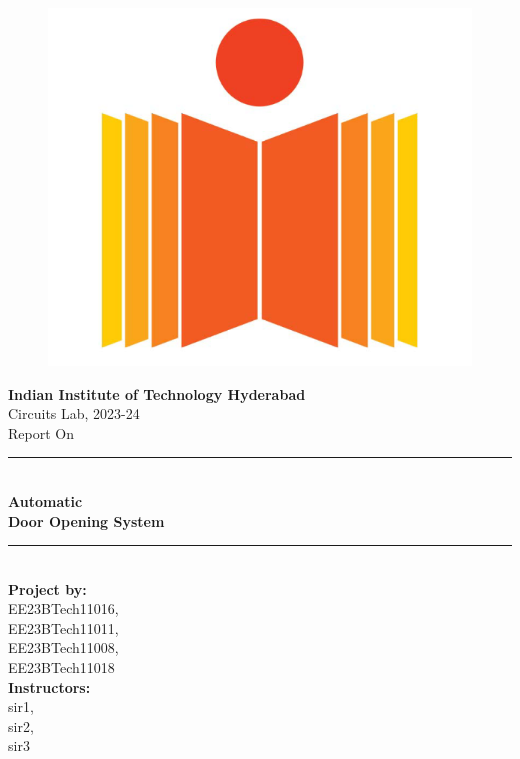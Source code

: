 \documentclass{article}
\begin{document}
\begin{figure}[H]
\centering
\includegraphics[scale = 0.2 ]{./figs/logo.png}
\end{figure}

\begin{center}
	\textbf{\LARGE Indian Institute of Technology Hyderabad} \\
	\vspace{1cm}
	\Large Circuits Lab, 2023-24\\
	\vspace{0.3cm}
	\large Report  On\\

	\rule{\linewidth}{0.5pt} \\
	\vspace{0.2cm}
	\textbf{\LARGE Automatic  \\ \vspace{0.3cm} Door Opening System} \\
	\vspace{0.1cm}
	\rule{\linewidth}{0.5pt} \\

	\vspace{1.5cm}
        \textbf{Project by: }\\
	\quad EE23BTech11016, \\
	\quad EE23BTech11011, \\
	\quad EE23BTech11008, \\
	\quad EE23BTech11018 \\
	
	\textbf{Instructors: }\\
	\quad sir1, \\
	\quad sir2, \\
	\quad sir3
	
	

	\vspace{1cm}
	\date{}
\end{center}
\end{document}
